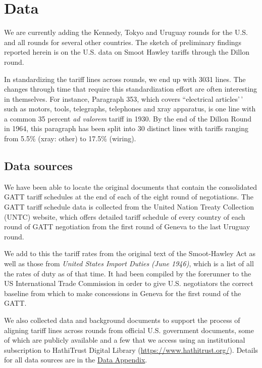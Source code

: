 \documentclass[
  12pt,
]{article}
\begin{document}
\hypertarget{data}{%
\section{Data}\label{data}}

We are currently adding the Kennedy, Tokyo and Uruguay rounds for the U.S. and all rounds for several other countries. The sketch of preliminary findings reported herein is on the U.S. data on Smoot Hawley tariffs through the Dillon round.

In standardizing the tariff lines across rounds, we end up with 3031 lines. The changes through time that require this standardization effort are often interesting in themselves. For instance, Paragraph 353, which covers ``electrical articles'\,' such as motors, tools, telegraphs, telephones and xray apparatus, is one line with a common 35 percent \emph{ad valorem} tariff in 1930. By the end of the Dillon Round in 1964, this paragraph has been split into 30 distinct lines with tariffs ranging from 5.5\% (xray: other) to 17.5\% (wiring).

\hypertarget{data-sources}{%
\subsection{Data sources}\label{data-sources}}

We have been able to locate the original documents that contain the consolidated GATT tariff schedules at the end of each of the eight round of negotiations. The GATT tariff schedule data is collected from the United Nation Treaty Collection (UNTC) website, which offers detailed tariff schedule of every country of each round of GATT negotiation from the first round of Geneva to the last Uruguay round.

We add to this the tariff rates from the original text of the Smoot-Hawley Act as well as those from \emph{United States Import Duties (June 1946)}, which is a list of all the rates of duty as of that time. It had been compiled by the forerunner to the US International Trade Commission in order to give U.S. negotiators the correct baseline from which to make concessions in Geneva for the first round of the GATT.

We also collected data and background documents to support the process of aligning tariff lines across rounds from official U.S. government documents, some of which are publicly available and a few that we access using an institutional subscription to HathiTrust Digital Library (\url{https://www.hathitrust.org/}). Details for all data sources are in the \protect\hyperlink{dataappendix}{Data Appendix}.
\end{document}
